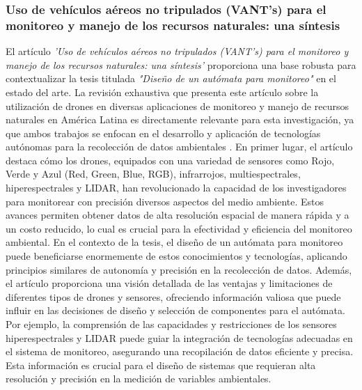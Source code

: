 \subsubsection{Uso de veh\'iculos a\'ereos  no tripulados (VANT's) para el monitoreo y manejo de los recursos naturales: una s\'intesis} %
\label{ssub:subsubsection name}
    El art\'iculo \textit{'Uso de veh\'iculos a\'ereos no tripulados (VANT's) para el monitoreo y manejo de los recursos naturales: una s\'intesis'} 
        proporciona una base robusta para contextualizar la tesis titulada \textit{"Dise\~no de un aut\'omata para monitoreo"} en 
        el estado del arte. La revisi\'on exhaustiva que presenta este art\'iculo sobre la utilizaci\'on de drones en diversas aplicaciones 
        de monitoreo y manejo de recursos naturales en Am\'erica Latina es directamente relevante para esta investigaci\'on, 
        ya que ambos trabajos se enfocan en el desarrollo y aplicaci\'on de tecnolog\'ias aut\'onomas para la recolecci\'on 
        de datos ambientales \cite{Guevara2020}.
    \vskip 0.5cm
    En primer lugar, el art\'iculo destaca c\'omo los drones, equipados con una variedad de sensores como Rojo, Verde y Azul (Red, Green, Blue, RGB), infrarrojos, 
        multiespectrales, hiperespectrales y LIDAR, han revolucionado la capacidad de los investigadores para monitorear 
        con precisi\'on diversos aspectos del medio ambiente. Estos avances permiten obtener datos de alta resoluci\'on espacial 
        de manera r\'apida y a un costo reducido, lo cual es crucial para la efectividad y eficiencia del monitoreo ambiental. 
        En el contexto de la tesis, el dise\~no de un aut\'omata para monitoreo puede beneficiarse enormemente de estos conocimientos 
        y tecnolog\'ias, aplicando principios similares de autonom\'ia y precisi\'on en la recolecci\'on de datos.
    \vskip 0.5cm
    Adem\'as, el art\'iculo proporciona una visi\'on detallada de las ventajas y limitaciones de diferentes tipos de drones y sensores, 
        ofreciendo informaci\'on valiosa que puede influir en las decisiones de dise\~no y selecci\'on de componentes para el aut\'omata. 
        Por ejemplo, la comprensi\'on de las capacidades y restricciones de los sensores hiperespectrales y LIDAR puede guiar 
        la integraci\'on de tecnolog\'ias adecuadas en el sistema de monitoreo, asegurando una recopilaci\'on de datos eficiente y 
        precisa. Esta informaci\'on es crucial para el dise\~no de sistemas que requieran alta resoluci\'on y precisi\'on en la medici\'on 
        de variables ambientales.
